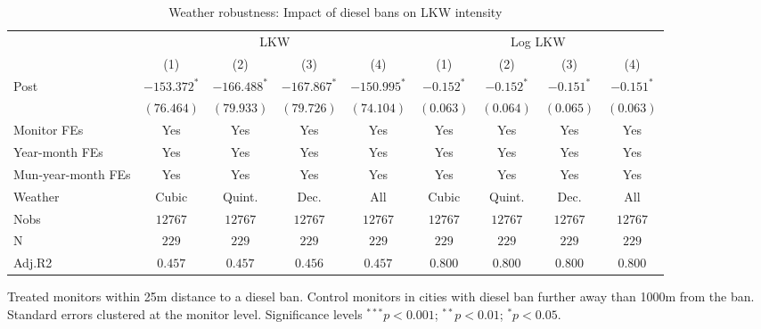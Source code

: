 
\begin{table}[h]
\caption{Weather robustness: Impact of diesel bans on LKW intensity}
\begin{center}
\begin{footnotesize}
\begin{threeparttable}
\begin{tabular}{l c c c c c c c c}
\toprule
& \multicolumn{4}{c}{LKW} & \multicolumn{4}{c}{Log LKW}  \\ \cmidrule(r){2-5} \cmidrule(r){6-9}
 & (1) & (2) & (3) & (4) & (1) & (2) & (3) & (4) \\
\midrule
Post   & $-153.372^{*}$ & $-166.488^{*}$ & $-167.867^{*}$ & $-150.995^{*}$ & $-0.152^{*}$ & $-0.152^{*}$ & $-0.151^{*}$ & $-0.151^{*}$ \\
       & $(76.464)$     & $(79.933)$     & $(79.726)$     & $(74.104)$     & $(0.063)$    & $(0.064)$    & $(0.065)$    & $(0.063)$    \\
\midrule
Monitor FEs   & Yes & Yes & Yes  & Yes & Yes & Yes & Yes & Yes     \\
Year-month FEs     & Yes & Yes & Yes  & Yes & Yes & Yes & Yes & Yes   \\
Mun-year-month FEs     & Yes & Yes & Yes  & Yes & Yes & Yes & Yes & Yes   \\
Weather     & Cubic & Quint. & Dec.  & All & Cubic & Quint. & Dec.  & All    \\ \midrule
Nobs   & $12767$        & $12767$        & $12767$        & $12767$        & $12767$      & $12767$      & $12767$      & $12767$      \\
N      & $229$          & $229$          & $229$          & $229$          & $229$        & $229$        & $229$        & $229$        \\
Adj.R2 & $0.457$        & $0.457$        & $0.456$        & $0.457$        & $0.800$      & $0.800$      & $0.800$      & $0.800$      \\
\bottomrule
\end{tabular}
\begin{tablenotes}[flushleft]
\tiny{\item Treated monitors within 25m distance to a diesel ban.
       Control monitors in cities with diesel ban further away than 1000m from the ban.
       Standard errors clustered at the monitor level.
       Significance levels $^{***}p<0.001$; $^{**}p<0.01$; $^{*}p<0.05$.}
\end{tablenotes}
\end{threeparttable}
\end{footnotesize}
\label{table:coefficients}
\end{center}
\end{table}
